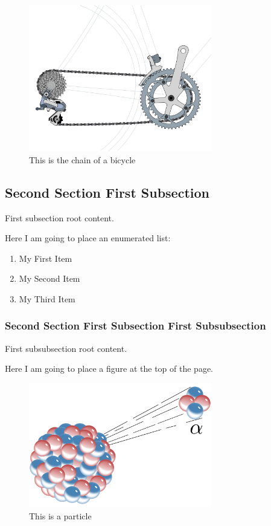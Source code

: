 \documentclass[12pt,twocolumn,a4paper,twoside]{article}
\begin{document}
\begin{figure}[h]
\includegraphics[width=80mm]{resources/bicycle.png}
\caption{This is the chain of a bicycle}
\label{bicycleFigure}
\end{figure}


\subsection{Second Section First Subsection}
First subsection root content.

Here I am going to place an enumerated list:

\begin{enumerate}
\item My First Item
\item My Second Item
\item My Third Item
\end{enumerate}

\subsubsection{Second Section First Subsection First Subsubsection}
First subsubsection root content.


Here I am going to place a figure at the top of the page.

\begin{figure}[t]
\begin{center}
\includegraphics[width=80mm]{resources/particle.png}
\caption{This is a particle}
\label{particleFigure}
\end{center}
\end{figure}
\end{document}

